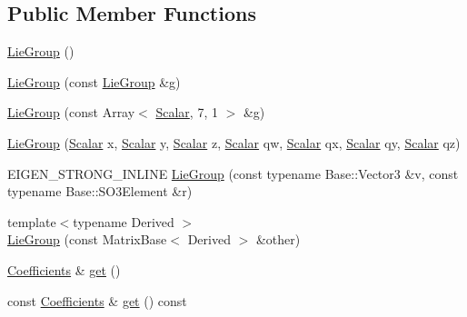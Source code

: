 \subsection*{Public Member Functions}
\begin{DoxyCompactItemize}
\item 
\hyperlink{class_lie_group_3_01_array_3_01___scalar_00_017_00_011_01_4_01_4_a5f6d9e49b663a718f984052f5925a084}{Lie\+Group} ()
\item 
\hyperlink{class_lie_group_3_01_array_3_01___scalar_00_017_00_011_01_4_01_4_a87d24de69e4c7cd0eb139e57b7833f10}{Lie\+Group} (const \hyperlink{class_lie_group}{Lie\+Group} \&g)
\item 
\hyperlink{class_lie_group_3_01_array_3_01___scalar_00_017_00_011_01_4_01_4_a585f2bf44ee6cfefb3fcd80a40abe75d}{Lie\+Group} (const Array$<$ \hyperlink{class_lie_group_3_01_array_3_01___scalar_00_017_00_011_01_4_01_4_a5fd29a7be3621d5df2717d910d47b3ce}{Scalar}, 7, 1 $>$ \&g)
\item 
\hyperlink{class_lie_group_3_01_array_3_01___scalar_00_017_00_011_01_4_01_4_aa26a8dec73f9a261d811ae4f31b7647f}{Lie\+Group} (\hyperlink{class_lie_group_3_01_array_3_01___scalar_00_017_00_011_01_4_01_4_a5fd29a7be3621d5df2717d910d47b3ce}{Scalar} x, \hyperlink{class_lie_group_3_01_array_3_01___scalar_00_017_00_011_01_4_01_4_a5fd29a7be3621d5df2717d910d47b3ce}{Scalar} y, \hyperlink{class_lie_group_3_01_array_3_01___scalar_00_017_00_011_01_4_01_4_a5fd29a7be3621d5df2717d910d47b3ce}{Scalar} z, \hyperlink{class_lie_group_3_01_array_3_01___scalar_00_017_00_011_01_4_01_4_a5fd29a7be3621d5df2717d910d47b3ce}{Scalar} qw, \hyperlink{class_lie_group_3_01_array_3_01___scalar_00_017_00_011_01_4_01_4_a5fd29a7be3621d5df2717d910d47b3ce}{Scalar} qx, \hyperlink{class_lie_group_3_01_array_3_01___scalar_00_017_00_011_01_4_01_4_a5fd29a7be3621d5df2717d910d47b3ce}{Scalar} qy, \hyperlink{class_lie_group_3_01_array_3_01___scalar_00_017_00_011_01_4_01_4_a5fd29a7be3621d5df2717d910d47b3ce}{Scalar} qz)
\item 
E\+I\+G\+E\+N\+\_\+\+S\+T\+R\+O\+N\+G\+\_\+\+I\+N\+L\+I\+NE \hyperlink{class_lie_group_3_01_array_3_01___scalar_00_017_00_011_01_4_01_4_aca6a6a912e91782e43634a03f3eeb1ac}{Lie\+Group} (const typename Base\+::\+Vector3 \&v, const typename Base\+::\+S\+O3\+Element \&r)
\item 
{\footnotesize template$<$typename Derived $>$ }\\\hyperlink{class_lie_group_3_01_array_3_01___scalar_00_017_00_011_01_4_01_4_a97bbc79b1dfc73b9fd35f79c0bcfc3c4}{Lie\+Group} (const Matrix\+Base$<$ Derived $>$ \&other)
\item 
\hyperlink{class_lie_group_3_01_array_3_01___scalar_00_017_00_011_01_4_01_4_aa5d0fac468a8bdbb468bf2218b93ee0e}{Coefficients} \& \hyperlink{class_lie_group_3_01_array_3_01___scalar_00_017_00_011_01_4_01_4_ac1572d622034e7582584d2f01aa76e8e}{get} ()
\item 
const \hyperlink{class_lie_group_3_01_array_3_01___scalar_00_017_00_011_01_4_01_4_aa5d0fac468a8bdbb468bf2218b93ee0e}{Coefficients} \& \hyperlink{class_lie_group_3_01_array_3_01___scalar_00_017_00_011_01_4_01_4_a55244313e03e1da27920e4d7a17c2cd3}{get} () const
\end{DoxyCompactItemize}
